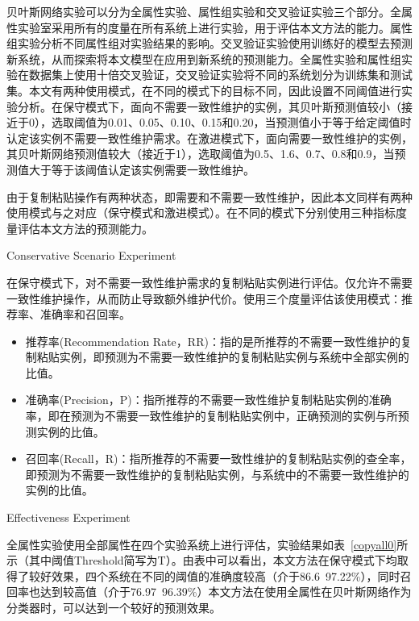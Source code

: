 贝叶斯网络实验可以分为全属性实验、属性组实验和交叉验证实验三个部分。全属性实验室采用所有的度量在所有系统上进行实验，用于评估本文方法的能力。属性组实验分析不同属性组对实验结果的影响。交叉验证实验使用训练好的模型去预测新系统，从而探索将本文模型在应用到新系统的预测能力。全属性实验和属性组实验在数据集上使用十倍交叉验证，交叉验证实验将不同的系统划分为训练集和测试集。本文有两种使用模式，在不同的模式下的目标不同，因此设置不同阈值进行实验分析。在保守模式下，面向不需要一致性维护的实例，其贝叶斯预测值较小（接近于0），选取阈值为0.01、0.05、0.10、0.15和0.20，当预测值小于等于给定阈值时认定该实例不需要一致性维护需求。在激进模式下，面向需要一致性维护的实例，其贝叶斯网络预测值较大（接近于1），选取阈值为0.5、1.6、0.7、0.8和0.9，当预测值大于等于该阈值认定该实例需要一致性维护。

由于复制粘贴操作有两种状态，即需要和不需要一致性维护，因此本文同样有两种使用模式与之对应（保守模式和激进模式）。在不同的模式下分别使用三种指标度量评估本文方法的预测能力。


{Conservative Scenario Experiment}


在保守模式下，对不需要一致性维护需求的复制粘贴实例进行评估。仅允许不需要一致性维护操作，从而防止导致额外维护代价。使用三个度量评估该使用模式：推荐率、准确率和召回率。
\begin{itemize}
\item	推荐率(Recommendation Rate，RR)：指的是所推荐的不需要一致性维护的复制粘贴实例，即预测为不需要一致性维护的复制粘贴实例与系统中全部实例的比值。
\item  准确率(Precision，P)：指所推荐的不需要一致性维护复制粘贴实例的准确率，即在预测为不需要一致性维护的复制粘贴实例中，正确预测的实例与所预测实例的比值。
\item  召回率(Recall，R)：指所推荐的不需要一致性维护的复制粘贴实例的查全率，即预测为不需要一致性维护的复制粘贴实例，与系统中的不需要一致性维护的实例的比值。
\end{itemize}

{Effectiveness Experiment}

全属性实验使用全部属性在四个实验系统上进行评估，实验结果如表~\ref{copyall0}所示（其中阈值Threshold简写为T）。由表中可以看出，本文方法在保守模式下均取得了较好效果，四个系统在不同的阈值的准确度较高（介于86.6~97.22\%），同时召回率也达到较高值（介于76.97~96.39\%）本文方法在使用全属性在贝叶斯网络作为分类器时，可以达到一个较好的预测效果。

